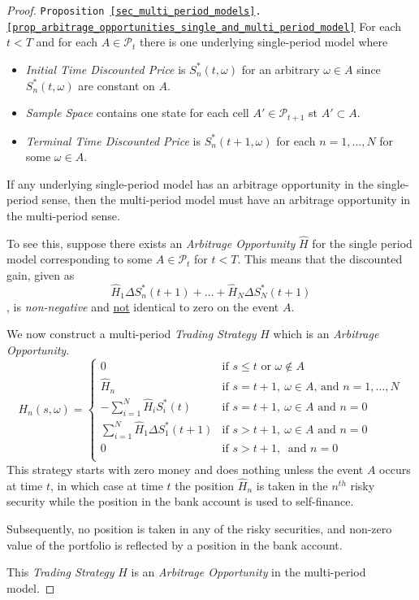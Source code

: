 \documentclass[11pt,a4paper]{article}
\begin{document}
  \begin{proof}{\texttt{Proposition \ref{sec_multi_period_models}.\ref{prop_arbitrage_opportunities_single_and_multi_period_model}}}
    For each $t<T$ and for each $A\in\mathcal{P}_t$ there is one underlying single-period model where
    \begin{itemize}
      \item \textit{Initial Time Discounted Price} is $S_n^*(t,\omega)$ for an arbitrary $\omega\in A$ since $S_n^*(t,\omega)$ are constant on $A$.
      \item \textit{Sample Space} contains one state for each cell $A'\in\mathcal{P}_{t+1}$ st $A'\subset A$.
      \item \textit{Terminal Time Discounted Price} is $S_n^*(t+1,\omega)$ for each $n=1,\dots,N$ for some $\omega\in A$.
    \end{itemize}
    If any underlying single-period model has an arbitrage opportunity in the single-period sense, then the multi-period model must have an arbitrage opportunity in the multi-period sense.
    \par To see this, suppose there exists an \textit{Arbitrage Opportunity} $\hat{H}$ for the single period model corresponding to some $A\in\mathcal{P}_t$ for $t<T$. This means that the discounted gain, given as
    \[ \hat{H}_1\Delta S_n^*(t+1)+\dots+\hat{H}_N\Delta S_N^*(t+1) \]
    , is \textit{non-negative} and \underline{not} identical to zero on the event $A$.
    \par We now construct a multi-period \textit{Trading Strategy} $H$ which is an \textit{Arbitrage Opportunity}.
    \[ H_n(s,\omega)=\begin{cases}
      0&\text{if }s\leq t\text{ or }\omega\not\in A\\
      \hat{H}_n&\text{if }s=t+1,\ \omega\in A\text{, and }n=1,\dots,N\\
      -\sum_{i=1}^N\hat{H}_iS_i^*(t)&\text{if }s=t+1,\ \omega\in A\text{ and }n=0\\
      \sum_{i=1}^N\hat{H}_1\Delta S_1^*(t+1)&\text{if }s>t+1,\ \omega\in A\text{ and }n=0\\
      0&\text{if }s>t+1,\ \text{ and }n=0\\
    \end{cases} \]
    This strategy starts with zero money and does nothing unless the event $A$ occurs at time $t$, in which case at time $t$ the position $\hat{H}_n$ is taken in the $n^{th}$ risky security while the position in the bank account is used to self-finance.
    \par Subsequently, no position is taken in any of the risky securities, and non-zero value of the portfolio is reflected by a position in the bank account.
    \par This \textit{Trading Strategy} $H$ is an \textit{Arbitrage Opportunity} in the multi-period model.\proved
  \end{proof}
\end{document}
